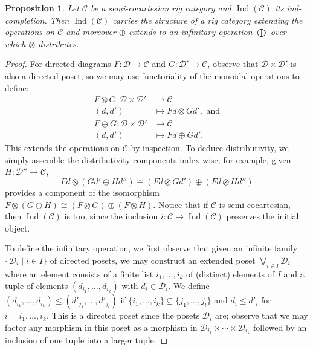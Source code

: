 \documentclass[12pt]{article}
\theoremstyle{plain}
\newtheorem{proposition}[thm]{Proposition}
\theoremstyle{definition}
\newcommand{\call}[1]{\mathcal{#1}}
\newcommand{\Ccal}{\call{C}}
\newcommand{\Dcal}{\call{D}}
\DeclareMathOperator{\ind}{Ind}
\begin{document}
\begin{proposition}
Let $\Ccal$ be a semi-cocartesian rig category and $\ind(\Ccal)$ its ind-completion. Then $\ind(\Ccal)$ carries the structure of a rig category extending the operations on $\Ccal$ and moreover ${\oplus}$ extends to an infinitary operation ${\bigoplus}$ over which ${\otimes}$ distributes.
\end{proposition}
\begin{proof}
For directed diagrams $F:\Dcal \to \Ccal$ and $G: \Dcal' \to \Ccal$, observe that $\Dcal \times \Dcal'$ is also a directed poset, so we may use functoriality of the monoidal operations to define:
\begin{align*}
F \otimes G : \Dcal \times \Dcal' &\to \Ccal \\
			(d,d') & \mapsto Fd \otimes Gd', \text{ and}\\
F \oplus G : \Dcal \times \Dcal' &\to \Ccal \\
			(d,d') & \mapsto Fd \oplus Gd'.
\end{align*}
This extends the operations on $\Ccal$ by inspection. To deduce distributivity, we simply assemble the distributivity components index-wise; for example, given $H: \Dcal'' \to \Ccal$,
\[Fd \otimes (Gd' \oplus Hd'') \cong (Fd \otimes Gd') \oplus (Fd \otimes Hd'')\]
provides a component of the isomorphism $F \otimes (G \oplus H) \cong (F \otimes G) \oplus (F \otimes H)$. Notice that if $\Ccal$ is semi-cocartesian, then $\ind(\Ccal)$ is too, since the inclusion $i: \Ccal \to \ind(\Ccal)$ preserves the initial object.

To define the infinitary operation, we first observe that given an infinite family $\{\Dcal_i \mid i \in I\}$ of directed posets, we may construct an extended poset $\bigvee_{i \in I}\Dcal_i$ where an element consists of a finite list $i_1,\dotsc,i_k$ of (distinct) elements of $I$ and a tuple of elements $(d_{i_1},\dotsc,d_{i_k})$ with $d_i \in \Dcal_i$. We define $(d_{i_1},\dotsc,d_{i_k}) \leq (d'_{j_1},\dotsc,d'_{j_l})$ if $\{i_1,\dotsc,i_k\} \subseteq \{j_1,\dotsc,j_l\}$ and $d_{i} \leq d'_{i}$ for $i = i_1,\dotsc,i_k$. This is a directed poset since the posets $\Dcal_i$ are; observe that we may factor any morphism in this poset as a morphism in $\Dcal_{i_1} \times \cdots \times \Dcal_{i_k}$ followed by an inclusion of one tuple into a larger tuple.


\end{proof}
\end{document}
